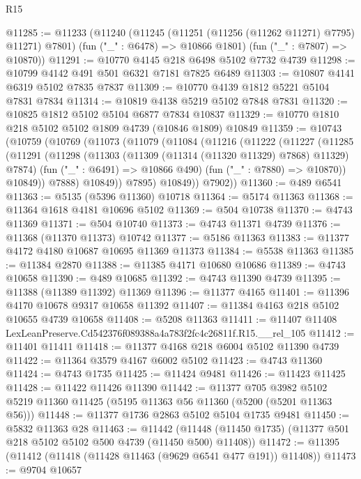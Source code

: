 \begin{lexlean}{R15}
\begin{coremodule}
{{{{{{{{{{{@11285 := @11233
    (@11240
      (@11245 (@11251 (@11256 (@11262 @11271) @7795) @11271) @7801)
      (fun ("_" : @6478) => @10866 @1801)
      (fun ("_" : @7807) => @10870))
@11291 := @10770 @4145 @218 @6498 @5102 @7732 @4739
@11298 := @10799 @4142 @491 @501 @6321 @7181 @7825 @6489
@11303 := @10807 @4141 @6319 @5102 @7835 @7837
@11309 := @10770 @4139 @1812 @5221 @5104 @7831 @7834
@11314 := @10819 @4138 @5219 @5102 @7848 @7831
@11320 := @10825 @1812 @5102 @5104 @6877 @7834 @10837
@11329 := @10770 @1810 @218 @5102 @5102 @1809 @4739 (@10846 @1809) @10849
@11359 := @10743
    (@10759
      (@10769
        (@11073
          (@11079
            (@11084
              (@11216
                (@11222
                  (@11227
                    (@11285
                      (@11291
                        (@11298
                          (@11303 (@11309 (@11314 (@11320 @11329) @7868) @11329) @7874)
                          (fun ("_" : @6491) => @10866 @490)
                          (fun ("_" : @7880) => @10870))
                        @10849))
                    @7888)
                  @10849))
              @7895)
            @10849))
        @7902))
@11360 := @489 @6541
@11363 := @5135 (@5396 @11360) @10718
@11364 := @5174 @11363
@11368 := @11364 @1618 @4181 @10696 @5102
@11369 := @504 @10738
@11370 := @4743 @11369
@11371 := @504 @10740
@11373 := @4743 @11371 @4739
@11376 := @11368 (@11370 @11373) @10742
@11377 := @5186 @11363
@11383 := @11377 @4172 @4180 @10687 @10695 @11369 @11373
@11384 := @5538 @11363
@11385 := @11384 @2870
@11388 := @11385 @4171 @10680 @10686
@11389 := @4743 @10658
@11390 := @489 @10685
@11392 := @4743 @11390 @4739
@11395 := @11388 (@11389 @11392) @11369
@11396 := @11377 @4165
@11401 := @11396 @4170 @10678 @9317 @10658 @11392
@11407 := @11384 @4163 @218 @5102 @10655 @4739 @10658
@11408 := @5208 @11363
@11411 := @11407 @11408 LexLeanPreserve.Cd542376f089388a4a783f2fc4c26811f.R15.__rel_105
@11412 := @11401 @11411
@11418 := @11377 @4168 @218 @6004 @5102 @11390 @4739
@11422 := @11364 @3579 @4167 @6002 @5102
@11423 := @4743 @11360
@11424 := @4743 @1735
@11425 := @11424 @9481
@11426 := @11423 @11425
@11428 := @11422 @11426 @11390
@11442 := @11377
    @705
    @3982
    @5102
    @5219
    @11360
    @11425
    (@5195 @11363 @56 @11360 (@5200 (@5201 @11363 @56)))
@11448 := @11377 @1736 @2863 @5102 @5104 @1735 @9481
@11450 := @5832 @11363 @28
@11463 := @11442
    (@11448 (@11450 @1735) (@11377 @501 @218 @5102 @5102 @500 @4739 (@11450 @500) @11408))
@11472 := @11395 (@11412 (@11418 (@11428 @11463 (@9629 @6541 @477 @191)) @11408))
@11473 := @9704 @10657
}}}}}}}}}}}
\end{coremodule}
\end{lexlean}
